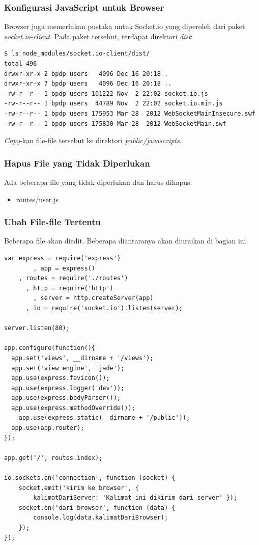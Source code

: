 \subsubsection{Konfigurasi JavaScript untuk Browser}

Browser juga memerlukan pustaka untuk Socket.io yang diperoleh dari paket \textit{socket.io-client}. Pada paket tersebut, terdapat direktori \textit{dist}:

\lstset{language=Bash,caption=Isi direktori dist di socket.io-client}
\begin{lstlisting}
$ ls node_modules/socket.io-client/dist/
total 496
drwxr-xr-x 2 bpdp users   4096 Dec 16 20:18 .
drwxr-xr-x 7 bpdp users   4096 Dec 16 20:18 ..
-rw-r--r-- 1 bpdp users 101222 Nov  2 22:02 socket.io.js
-rw-r--r-- 1 bpdp users  44789 Nov  2 22:02 socket.io.min.js
-rw-r--r-- 1 bpdp users 175953 Mar 28  2012 WebSocketMainInsecure.swf
-rw-r--r-- 1 bpdp users 175830 Mar 28  2012 WebSocketMain.swf
\end{lstlisting}

\textit{Copy}-kan file-file tersebut ke direktori \textit{public/javascripts}.

\subsubsection{Hapus File yang Tidak Diperlukan}

Ada beberapa file yang tidak diperlukan dan harus dihapus:
\begin{itemize}
	\item routes/user.js
\end{itemize}

\subsubsection{Ubah File-file Tertentu}

Beberapa file akan diedit. Beberapa diantaranya akan diuraikan di bagian ini.

\lstset{language=JavaScript,caption=app.js}
\begin{lstlisting}
var express = require('express')
		, app = express()
  	, routes = require('./routes')
	  , http = require('http')
		, server = http.createServer(app)
	  , io = require('socket.io').listen(server);

server.listen(80);

app.configure(function(){
  app.set('views', __dirname + '/views');
  app.set('view engine', 'jade');
  app.use(express.favicon());
  app.use(express.logger('dev'));
  app.use(express.bodyParser());
  app.use(express.methodOverride());
	app.use(express.static(__dirname + '/public'));
  app.use(app.router);
});

app.get('/', routes.index);

io.sockets.on('connection', function (socket) {
	socket.emit('kirim ke browser', { 
		kalimatDariServer: 'Kalimat ini dikirim dari server' });
	socket.on('dari browser', function (data) {
		console.log(data.kalimatDariBrowser);
	});
});
\end{lstlisting}

